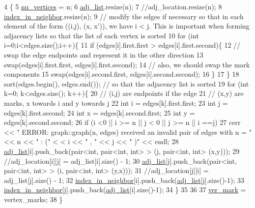 \begin{DoxyCode}
4 \{ 
5   \hyperlink{classmarked__graph_acf79c6aeb8f32614cb14a5baaa6c9f9b}{nu\_vertices} = n;
6   \hyperlink{classmarked__graph_a1a0bf7ca413a278763f7c878b3b6fd6f}{adj\_list}.resize(n);
7   \textcolor{comment}{//adj\_location.resize(n);}
8   \hyperlink{classmarked__graph_aee10b537408de42476609c1e45c075d0}{index\_in\_neighbor}.resize(n);
9   \textcolor{comment}{// modify the edges if necessary so that in each element of the form ((i,j), (x, x')), we have i < j.
       This is important when forming adjacency lists so that the list of each vertex is sorted}
10   \textcolor{keywordflow}{for} (\textcolor{keywordtype}{int} i=0;i<edges.size();i++)\{
11     \textcolor{keywordflow}{if} (edges[i].first.first > edges[i].first.second)\{
12       \textcolor{comment}{// swap the edge endpoints and represent it in the other direction}
13       swap(edges[i].first.first, edges[i].first.second);
14       \textcolor{comment}{// also, we should swap the mark components}
15       swap(edges[i].second.first, edges[i].second.second);
16     \}
17   \}
18   sort(edges.begin(), edges.end()); \textcolor{comment}{// so that the adjacency list is sorted}
19   \textcolor{keywordflow}{for} (\textcolor{keywordtype}{int} k=0; k<edges.size(); k++)\{
20     \textcolor{comment}{// (i,j) are endpoints if the edge}
21     \textcolor{comment}{// (x,y) are marks, x towards i and y towards j}
22     \textcolor{keywordtype}{int} i = edges[k].first.first;
23     \textcolor{keywordtype}{int} j = edges[k].first.second;
24     \textcolor{keywordtype}{int} x = edges[k].second.first;
25     \textcolor{keywordtype}{int} y = edges[k].second.second;
26     \textcolor{keywordflow}{if} (i <0 || i >= n || j < 0 || j >= n || i ==j)
27       cerr << \textcolor{stringliteral}{" ERROR: graph::graph(n, edges) received an invalid pair of edges with n = "} << n << \textcolor{stringliteral}{" : ("} <
      < i << \textcolor{stringliteral}{" , "} << j << \textcolor{stringliteral}{" )"} << endl;
28     \hyperlink{classmarked__graph_a1a0bf7ca413a278763f7c878b3b6fd6f}{adj\_list}[i].push\_back(pair<\textcolor{keywordtype}{int}, pair<int, int> > (j, pair<int, int> (x,y)));
29     \textcolor{comment}{//adj\_location[i][j] = adj\_list[i].size() - 1;}
30     \hyperlink{classmarked__graph_a1a0bf7ca413a278763f7c878b3b6fd6f}{adj\_list}[j].push\_back(pair<\textcolor{keywordtype}{int}, pair<int, int> > (i, pair<int, int> (y,x)));
31     \textcolor{comment}{//adj\_location[j][i] = adj\_list[j].size() - 1;}
32     \hyperlink{classmarked__graph_aee10b537408de42476609c1e45c075d0}{index\_in\_neighbor}[i].push\_back(\hyperlink{classmarked__graph_a1a0bf7ca413a278763f7c878b3b6fd6f}{adj\_list}[j].size()-1);
33     \hyperlink{classmarked__graph_aee10b537408de42476609c1e45c075d0}{index\_in\_neighbor}[j].push\_back(\hyperlink{classmarked__graph_a1a0bf7ca413a278763f7c878b3b6fd6f}{adj\_list}[i].size()-1);
34   \}
35 
36 
37   \hyperlink{classmarked__graph_ac83e9377dd4d8bb95be1ac949b127296}{ver\_mark} = vertex\_marks;
38 \}
\end{DoxyCode}


